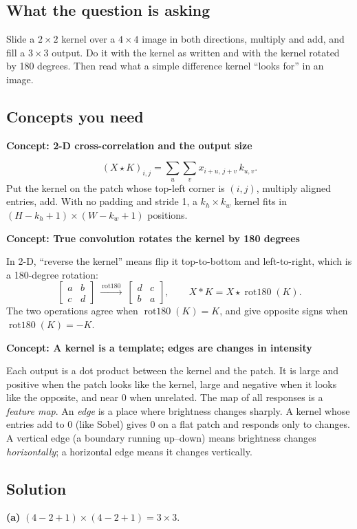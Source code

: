 \documentclass[12pt,a4paper]{article}
\newcommand{\concept}[2]{\par\medskip\phantomsection\label{#1}{\large\bfseries\color{blue!50!black} Concept: #2}\par}
\newcommand{\rot}{\operatorname{rot180}}
\begin{document}
\subsection*{What the question is asking}
Slide a $2\times2$ kernel over a $4\times4$ image in both directions, multiply and add, and fill a $3\times3$ output. Do it with the kernel as written and with the kernel rotated by 180 degrees. Then read what a simple difference kernel ``looks for'' in an image.

\subsection*{Concepts you need}

\concept{c:corr2d}{2-D cross-correlation and the output size}
\[
(X\star K)_{i,j}=\sum_{u}\sum_{v}x_{i+u,\,j+v}\,k_{u,v}.
\]
Put the kernel on the patch whose top-left corner is $(i,j)$, multiply aligned entries, add. With no padding and stride 1, a $k_h\times k_w$ kernel fits in $(H-k_h+1)\times(W-k_w+1)$ positions.

\concept{c:rot180}{True convolution rotates the kernel by 180 degrees}
In 2-D, ``reverse the kernel'' means flip it top-to-bottom and left-to-right, which is a 180-degree rotation:
\[
\begin{bmatrix}a&b\\c&d\end{bmatrix}\ \xrightarrow{\ \rot\ }\ \begin{bmatrix}d&c\\b&a\end{bmatrix},\qquad X*K=X\star\rot(K).
\]
The two operations agree when $\rot(K)=K$, and give opposite signs when $\rot(K)=-K$.

\concept{c:template}{A kernel is a template; edges are changes in intensity}
Each output is a dot product between the kernel and the patch. It is large and positive when the patch looks like the kernel, large and negative when it looks like the opposite, and near 0 when unrelated. The map of all responses is a \emph{feature map}. An \emph{edge} is a place where brightness changes sharply. A kernel whose entries add to 0 (like Sobel) gives 0 on a flat patch and responds only to changes. A vertical edge (a boundary running up--down) means brightness changes \emph{horizontally}; a horizontal edge means it changes vertically.

\subsection*{Solution}
\textbf{(a)} $(4-2+1)\times(4-2+1)=3\times3$.
\end{document}
